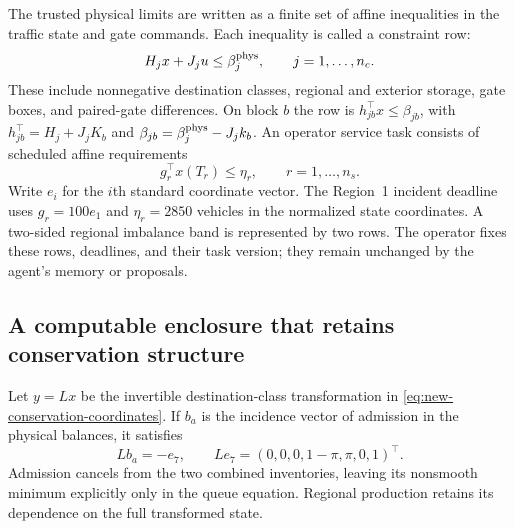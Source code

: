 \documentclass[journal,10pt]{IEEEtran}
\begin{document}
The trusted physical limits are written as a finite set of affine
inequalities in the traffic state and gate commands. Each inequality is
called a constraint row:
\begin{equation}
 H_jx+J_ju\le \beta_j^{\rm phys},
 \qquad j=1,\ldots,n_c.
 \label{eq:new-physical-rows}
\end{equation}
These include nonnegative destination classes, regional and exterior storage,
gate boxes, and paired-gate differences. On block $b$ the row is
$h_{jb}^{\top}x\le\beta_{jb}$, with
$h_{jb}^{\top}=H_j+J_jK_b$ and $\beta_{jb}=\beta_j^{\rm phys}-J_jk_b$.
An operator service task consists of scheduled affine requirements
\begin{equation}
 g_r^{\top}x(T_r)\le\eta_r,
 \qquad r=1,\ldots,n_s.
 \label{eq:new-service-rows}
\end{equation}
Write $e_i$ for the $i$th standard coordinate vector. The Region~1 incident
deadline uses $g_r=100e_1$ and $\eta_r=2850$ vehicles
in the normalized state coordinates. A two-sided regional imbalance band is
represented by two rows. The operator fixes these rows, deadlines, and their
task version; they remain unchanged by the agent's memory or proposals.

\subsection{A computable enclosure that retains conservation structure}

Let $y=Lx$ be the invertible destination-class transformation in
\eqref{eq:new-conservation-coordinates}. If $b_a$ is the incidence vector of
admission in the physical balances, it satisfies
\begin{equation}
 Lb_a=-e_7,
 \qquad Le_7=(0,0,0,1-\pi,\pi,0,1)^\top.
 \label{eq:new-conservation-incidence}
\end{equation}
Admission cancels from the two combined inventories, leaving its nonsmooth
minimum explicitly only in the queue equation. Regional production retains
its dependence on the full transformed state.
\end{document}
